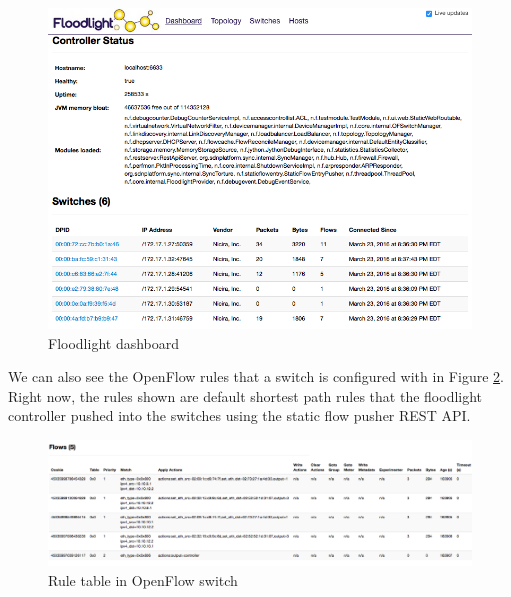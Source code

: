 \documentclass[paper=a4, fontsize=11pt]{scrartcl}	%
\numberwithin{equation}{section}		%
\numberwithin{figure}{section}			%
\numberwithin{table}{section}				%
\begin{document}
\begin{figure}[H]
\begin{center}
\includegraphics[scale=0.45]{floodlight.png}   
\end{center}
 \caption{Floodlight dashboard}
 \label{Fig 4.2}
\end{figure}
We can also see the OpenFlow rules that a switch is configured with in Figure \ref{Fig 4.3}. Right now, the rules shown are default shortest path rules that the floodlight controller pushed into the switches using the static flow pusher REST API.
\begin{figure}[H]
\begin{center}
\includegraphics[scale=0.35]{rules.png}   
\end{center}
 \caption{Rule table in OpenFlow switch}
 \label{Fig 4.3}
\end{figure}
\end{document}
